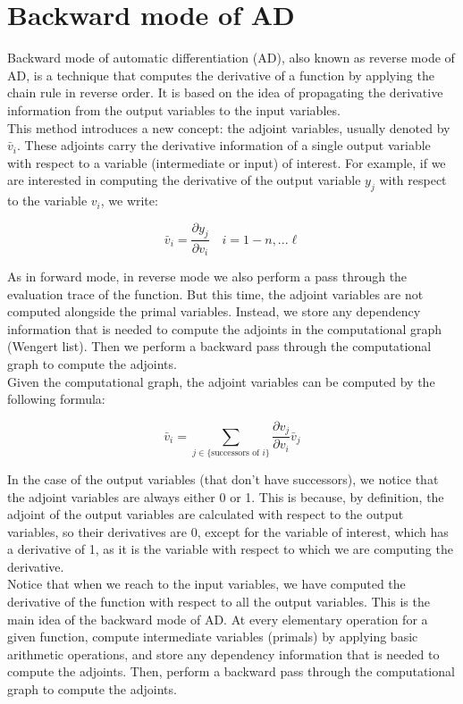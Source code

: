 \section{Backward mode of AD}

Backward mode of automatic differentiation (AD), also known as reverse mode of AD, is a technique
that computes the derivative of a function by applying the chain rule in reverse order. It is based
on the idea of propagating the derivative information from the output variables to the input variables.\\

This method introduces a new concept: the adjoint variables, usually denoted by $\bar{v}_i$. These
adjoints carry the derivative information of a single output variable with respect to a variable
(intermediate or input) of interest. For example, if we are interested in computing the derivative
of the output variable $y_j$ with respect to the variable $v_i$, we write:

$$\bar{v}_i = \frac{\partial y_j}{\partial v_i} \quad i = 1-n, ... \ell$$

As in forward mode, in reverse mode we also perform a pass through the evaluation trace of the function.
But this time, the adjoint variables are not computed alongside the primal variables. Instead, we store
any dependency information that is needed to compute the adjoints in the computational graph (Wengert list).
Then we perform a backward pass through the computational graph to compute the adjoints.\\

Given the computational graph, the adjoint variables can be computed by the following formula:

\begin{equation}
    \bar{v}_i = \sum_{j \in \{\text{successors of } i\}} \frac{\partial v_j}{\partial v_i} \bar{v}_j
\end{equation}

In the case of the output variables (that don't have successors), we notice that the adjoint variables
are always either 0 or 1. This is because, by definition, the adjoint of the output variables are calculated
with respect to the output variables, so their derivatives are 0, except for the variable of interest, which
has a derivative of 1, as it is the variable with respect to which we are computing the derivative.\\

Notice that when we reach to the input variables, we have computed the derivative of the function with respect
to all the output variables. This is the main idea of the backward mode of AD. At every elementary operation
for a given function, compute intermediate variables (primals) by applying basic arithmetic operations, and
store any dependency information that is needed to compute the adjoints. Then, perform a backward pass through
the computational graph to compute the adjoints.\\

